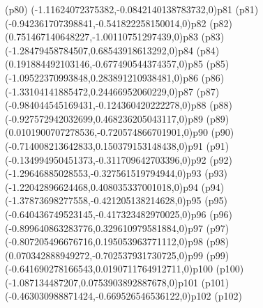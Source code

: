 \psdot(p80)
\psPoint(-1.11624072375382,-0.0842140138783732,0){p81}
\psdot(p81)
\psPoint(-0.942361707398841,-0.541822258150014,0){p82}
\psdot(p82)
\psPoint(0.751467140648227,-1.00110751297439,0){p83}
\psdot(p83)
\psPoint(-1.28479458784507,0.68543918613292,0){p84}
\psdot(p84)
\psPoint(0.191884492103146,-0.677490544374357,0){p85}
\psdot(p85)
\psPoint(-1.09522370993848,0.283891210938481,0){p86}
\psdot(p86)
\psPoint(-1.33104141885472,0.24466952060229,0){p87}
\psdot(p87)
\psPoint(-0.984044545169431,-0.124360420222278,0){p88}
\psdot(p88)
\psPoint(-0.927572942032699,0.468236205043117,0){p89}
\psdot(p89)
\psPoint(0.0101900707278536,-0.720574866701901,0){p90}
\psdot(p90)
\psPoint(-0.714008213642833,0.150379153148438,0){p91}
\psdot(p91)
\psPoint(-0.134994950451373,-0.311709642703396,0){p92}
\psdot(p92)
\psPoint(-1.29646885028553,-0.327561519794944,0){p93}
\psdot(p93)
\psPoint(-1.22042896624468,0.408035337001018,0){p94}
\psdot(p94)
\psPoint(-1.37873698277558,-0.421205138214628,0){p95}
\psdot(p95)
\psPoint(-0.640436749523145,-0.417323482970025,0){p96}
\psdot(p96)
\psPoint(-0.899640863283776,0.329610979581884,0){p97}
\psdot(p97)
\psPoint(-0.807205496676716,0.195053963771112,0){p98}
\psdot(p98)
\psPoint(0.070342888949272,-0.702537931730725,0){p99}
\psdot(p99)
\psPoint(-0.641690278166543,0.0190711764912711,0){p100}
\psdot(p100)
\psPoint(-1.087134487207,0.0753903892887678,0){p101}
\psdot(p101)
\psPoint(-0.463030988871424,-0.669526546536122,0){p102}
\psdot(p102)
